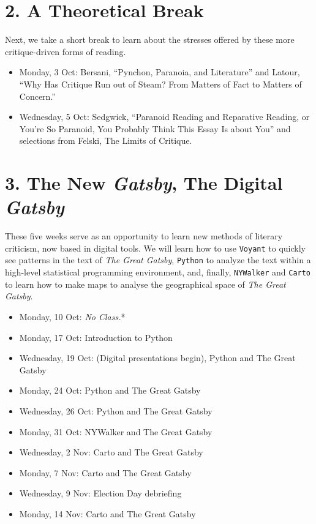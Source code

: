 \section{2. A Theoretical Break}
\label{2.atheoreticalbreak}

Next, we take a short break to learn about the stresses offered by these more
critique-driven forms of reading.

\begin{itemize}
\item Monday, 3 Oct: Bersani, “Pynchon, Paranoia, and Literature” and Latour,
“Why Has Critique Run out of Steam? From Matters of Fact to Matters of
Concern.”

\item Wednesday, 5 Oct: Sedgwick, “Paranoid Reading and Reparative Reading, or
You’re So Paranoid, You Probably Think This Essay Is about You” and
selections from Felski, The Limits of Critique.

\end{itemize}

\section{3. The New \emph{Gatsby}, The Digital \emph{Gatsby}}
\label{3.thenewgatsbythedigitalgatsby}

These five weeks serve as an opportunity to learn new methods of literary
criticism, now based in digital tools. We will learn how to use \texttt{Voyant} to
quickly see patterns in the text of \emph{The Great Gatsby}, \texttt{Python} to analyze the
text within a high-level statistical programming environment, and, finally,
\texttt{NYWalker} and \texttt{Carto} to learn how to make maps to analyse the geographical
space of \emph{The Great Gatsby}.

\begin{itemize}
\item Monday, 10 Oct: \emph{No Class.}*

\item Monday, 17 Oct: Introduction to Python

\item Wednesday, 19 Oct: (Digital presentations begin), Python and The Great Gatsby

\item Monday, 24 Oct: Python and The Great Gatsby

\item Wednesday, 26 Oct: Python and The Great Gatsby

\item Monday, 31 Oct: NYWalker and The Great Gatsby

\item Wednesday, 2 Nov: Carto and The Great Gatsby

\item Monday, 7 Nov: Carto and The Great Gatsby

\item Wednesday, 9 Nov: Election Day debriefing

\item Monday, 14 Nov: Carto and The Great Gatsby

\end{itemize}

